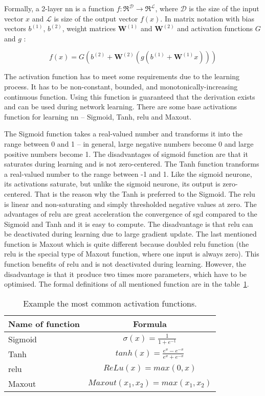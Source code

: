 \documentclass[thesis=M,english]{FITthesis}[2012/10/20]
\begin{document}
Formally, a 2-layer \gls{nn} is a function $f: \Re^\mathcal{D} \rightarrow \Re^\mathcal{L}$, where $\mathcal{D}$ is the size of the input vector $x$ and $\mathcal{L}$ is size of the output vector $f(x)$. In matrix notation with bias vectors $b^{(1)}$, $b^{(2)}$, weight matrices $\mathbf{W}^{(1)}$ and  $\mathbf{W}^{(2)}$ and activation functions $G$ and $g$ \cite{theano_mlp}:

\begin{equation}
f(x) =  G(b^{(2)} + \mathbf{W}^{(2)}(g(b^{(1)} + \mathbf{W}^{(1)}x)))
\end{equation}

The activation function has to meet some requirements due to the learning process. It has to be non-constant, bounded, and monotonically-increasing continuous function. Using this function is guaranteed that the derivation exists and can be used during network learning. There are some base activations function for learning \gls{nn} -- Sigmoid, Tanh, \gls{relu} and Maxout\cite{Johnson2017ann_intro}.

The Sigmoid function takes a real-valued number and transforms it into the range between 0 and 1 -- in general, large negative numbers become 0 and large positive numbers become 1. The disadvantages of sigmoid function are that it saturates during learning and is not zero-centered. The Tanh function transforms a real-valued number to the range between -1 and 1. Like the sigmoid neurone, its activations saturate, but unlike the sigmoid neurone, its output is zero-centered. That is the reason why the Tanh is preferred to the Sigmoid. The \gls{relu} is linear and non-saturating and simply thresholded negative values at zero. The advantages of \gls{relu} are great acceleration the convergence of \gls{sgd} compared to the Sigmoid and Tanh and it is easy to compute. The disadvantage is that \gls{relu} can be deactivated during learning due to large gradient update. The last mentioned function is Maxout which is quite different because doubled \gls{relu} function (the \gls{relu} is the special type of Maxout function, where one input is always zero). This function benefits of \gls{relu} and is not deactivated during learning. However, the disadvantage is that it produce two times more parameters, which have to be optimised.\cite{Johnson2017ann_intro} The formal definitions of all mentioned function are in the table~\ref{tab:activations}.

{\renewcommand{\arraystretch}{1.7}%
\begin{table}[H]\centering
    \begin{small}
        \caption{Example the most common activation functions.}\label{tab:activations}
        \begin{tabular}{|l|c|}\hline
        Name of function & Formula \tabularnewline \hline \hline
        Sigmoid & $\sigma(x)=\frac{1}{1+e^{-1}}$ \tabularnewline \hline 
        Tanh & $tanh(x) =\frac{e^x - e^{-x}}{e^x+e^{-x}}$ \tabularnewline \hline 
        \gls{relu} & $ ReLu(x) = max(0,x)$ \tabularnewline \hline 
        Maxout & $ Maxout(x_1, x_2) = max(x_1, x_2)$ \tabularnewline \hline 
        \end{tabular}
    \end{small}
\end{table}}
\end{document}
